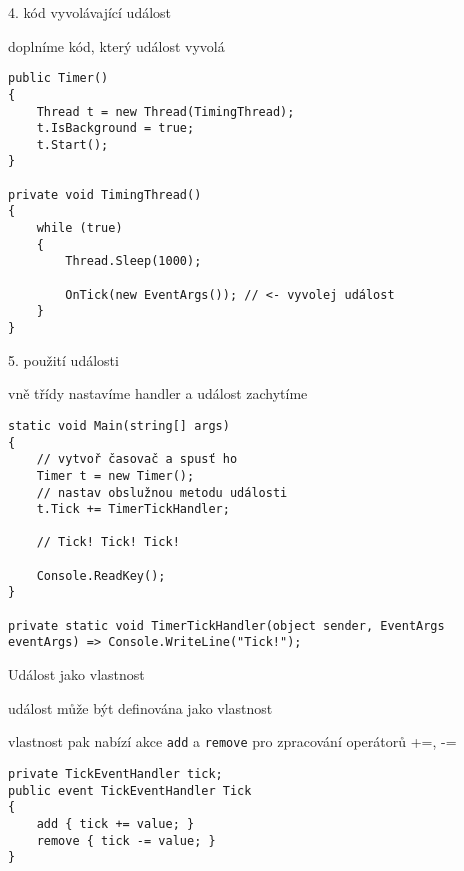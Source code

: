 \begin{frame}[fragile]
\vfill
\begin{bitemize}{4. kód vyvolávající událost}
\item doplníme kód, který událost vyvolá
\end{bitemize}
\vfill
\begin{yesblock}
\begin{lstlisting}
public Timer()
{
    Thread t = new Thread(TimingThread);
    t.IsBackground = true;
    t.Start();
}

private void TimingThread()
{
    while (true)
    {
        Thread.Sleep(1000);

        OnTick(new EventArgs()); // <- vyvolej událost
    }
}
\end{lstlisting}
\end{yesblock}
\vfill
\end{frame}




\begin{frame}[fragile]
\vfill
\begin{bitemize}{5. použití události}
\item vně třídy nastavíme handler a událost zachytíme
\end{bitemize}
\vfill
\begin{yesblock}
\begin{lstlisting}
static void Main(string[] args)
{
	// vytvoř časovač a spusť ho
    Timer t = new Timer();
    // nastav obslužnou metodu události
    t.Tick += TimerTickHandler;

    // Tick! Tick! Tick!

    Console.ReadKey();
}

private static void TimerTickHandler(object sender, EventArgs eventArgs) => Console.WriteLine("Tick!");
\end{lstlisting}
\end{yesblock}
\vfill
\end{frame}





\begin{frame}[fragile]
\vfill
\begin{bitemize}{Událost jako vlastnost}
\item událost může být definována jako vlastnost
\item vlastnost pak nabízí akce \lstinline|add| a \lstinline|remove| pro zpracování operátorů +=, -=
\end{bitemize}
\vfill
\begin{yesblock}
\begin{lstlisting}[morekeywords={add,remove,value}]
private TickEventHandler tick;
public event TickEventHandler Tick
{
    add { tick += value; }
    remove { tick -= value; }
}
\end{lstlisting}
\end{yesblock}
\vfill
\end{frame}
